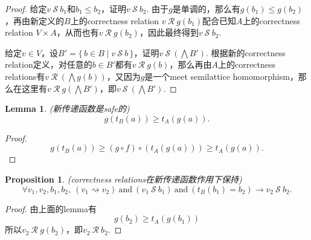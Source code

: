 \documentclass{article}
\newtheorem{lemma}[theorem]{Lemma}
\newtheorem{proposition}[theorem]{Proposition}
\newcommand\Set[2]{\{\,#1\mid#2\,\}} %
\begin{document}
\begin{proof}
给定$v~\mathcal{S}~b_1$和$b_1 \leq b_2$，证明$v ~ \mathcal{S}~b_2$. 由于$g$是单调的，那么有$g(b_1) \leq g(b_2)$，再由新定义的$B$上的correctness relation $v~\mathcal{R}~g(b_1)$配合已知$A$上的correctness relation $V \times A$，从而也有$v~\mathcal{R}~g(b_2)$，因此最终得到$v ~ \mathcal{S}~b_2$. 

给定$v \in V$，设$B' = \Set{b \in B}{v~\mathcal{S}~b }$，证明$v~\mathcal{S}~(\bigwedge B')$. 根据新的correctness relation定义，对任意的$b \in B'$都有$v~\mathcal{R}~g(b)$，那么再由$A$上的correctness relations有$v ~\mathcal{R}~(\bigwedge g(b))$，又因为$g$是一个meet semilattice homomorphism，那么在这里有$v~\mathcal{R}~g(\bigwedge B')$，即$v~\mathcal{S}~(\bigwedge B')$.
\end{proof}

\begin{lemma} \rm {\color{red}(新传递函数是safe的)}
$$
g(t_B(a)) \geq t_A(g(a)).
$$
\end{lemma}

\begin{proof}
$$
g(t_B(a)) \geq (g \circ f)\circ (t_A(g(a))) \geq t_A(g(a)).
$$
\end{proof}

\begin{proposition}
\rm {\color{red}(correctness relations在新传递函数作用下保持)}
$$
\forall v_1,v_2,b_1,b_2,~(v_1 \rightsquigarrow v_2)~\text{and}~(v_1 ~\mathcal{S}~b_1)~\text{and}~(t_B(b_1) = b_2) \rightarrow v_2~\mathcal{S}~ b_2.
$$
\end{proposition}

\begin{proof}
由上面的lemma有
$$
g(b_2) \geq t_A(g(b_1))
$$
所以$v_2~\mathcal{R}~g(b_2)$，即$v_2~\mathcal{R}~b_2$.
\end{proof}
\end{document}
